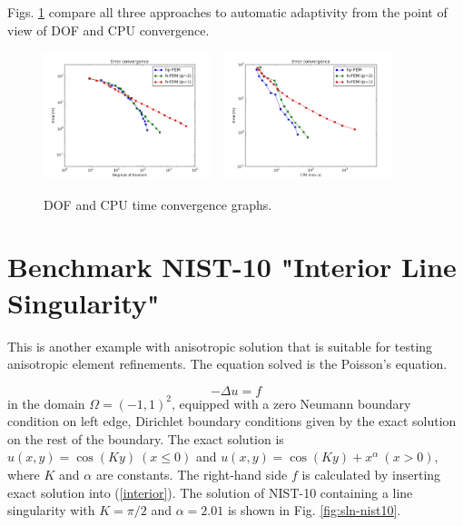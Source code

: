 \documentclass[12pt]{elsarticle}
\begin{document}
Figs. \ref{fig:nist-9-conv} compare all
three approaches to automatic adaptivity from the point
of view of DOF and CPU convergence.

\begin{figure}[H]
\centering
\vspace{-5mm}
\includegraphics[height=3.7cm]{nist/nist-9/conv_dof_aniso.png}\ \
\includegraphics[height=3.7cm]{nist/nist-9/conv_cpu_aniso.png}
\vspace{-5mm}
\caption{DOF and CPU time convergence graphs.}
\vspace{-5mm}
\label{fig:nist-9-conv}
\end{figure}


\section{Benchmark NIST-10 "Interior Line Singularity"}
\label{sec:bench-10}

This is another example with anisotropic solution that is suitable for testing
anisotropic element refinements. The equation solved is the Poisson's equation.

\begin{equation} \label{interior}
-\Delta u = f
\end{equation}
in the domain $\Omega = (-1, 1)^2$, equipped with a zero
Neumann boundary condition on left edge, Dirichlet boundary
conditions given by the exact solution on the rest of the boundary.
The exact solution is
$u(x,y) = \cos(Ky)\ (x \le 0)$ and $u(x,y) = \cos(Ky) + x^{\alpha}\ (x > 0)$,
where $K$ and $\alpha$ are constants.
The right-hand side $f$ is calculated by inserting exact solution into (\ref{interior}).
The solution of NIST-10 containing a line singularity with $K = \pi/2$ and
$\alpha = 2.01$ is shown in Fig. \ref{fig:sln-nist10}.
\end{document}
